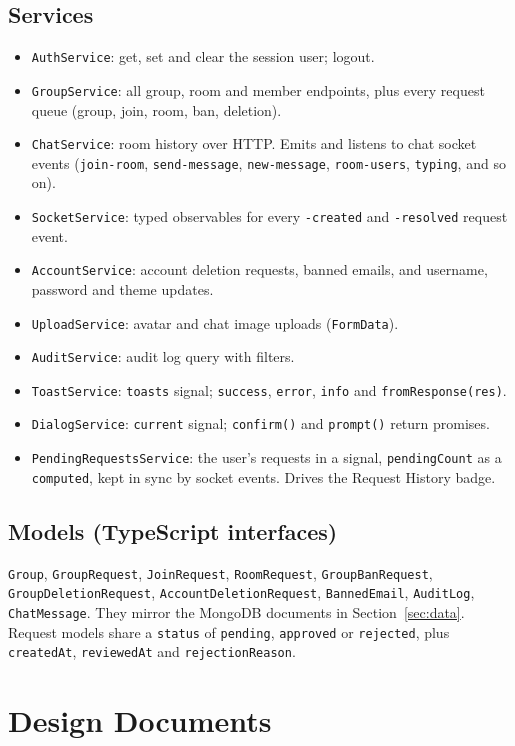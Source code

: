 \documentclass[10pt,a4paper]{article}
\newcommand{\ep}[1]{\texttt{\small #1}}
\begin{document}
\subsection{Services}
\begin{itemize}
\item \ep{AuthService}: get, set and clear the session user; logout.
\item \ep{GroupService}: all group, room and member endpoints, plus every request queue (group, join, room, ban, deletion).
\item \ep{ChatService}: room history over HTTP. Emits and listens to chat socket events (\ep{join-room}, \ep{send-message}, \ep{new-message}, \ep{room-users}, \ep{typing}, and so on).
\item \ep{SocketService}: typed observables for every \ep{*-created} and \ep{*-resolved} request event.
\item \ep{AccountService}: account deletion requests, banned emails, and username, password and theme updates.
\item \ep{UploadService}: avatar and chat image uploads (\ep{FormData}).
\item \ep{AuditService}: audit log query with filters.
\item \ep{ToastService}: \ep{toasts} signal; \ep{success}, \ep{error}, \ep{info} and \ep{fromResponse(res)}.
\item \ep{DialogService}: \ep{current} signal; \ep{confirm()} and \ep{prompt()} return promises.
\item \ep{PendingRequestsService}: the user's requests in a signal, \ep{pendingCount} as a \ep{computed}, kept in sync by socket events. Drives the Request History badge.
\end{itemize}

\subsection{Models (TypeScript interfaces)}
{\raggedright \ep{Group}, \ep{GroupRequest}, \ep{JoinRequest}, \ep{RoomRequest}, \ep{GroupBanRequest}, \ep{GroupDeletionRequest}, \ep{AccountDeletionRequest}, \ep{BannedEmail}, \ep{AuditLog}, \ep{ChatMessage}. They mirror the MongoDB documents in Section~\ref{sec:data}. Request models share a \ep{status} of \ep{pending}, \ep{approved} or \ep{rejected}, plus \ep{createdAt}, \ep{reviewedAt} and \ep{rejectionReason}.\par}

\section{Design Documents}
\end{document}
